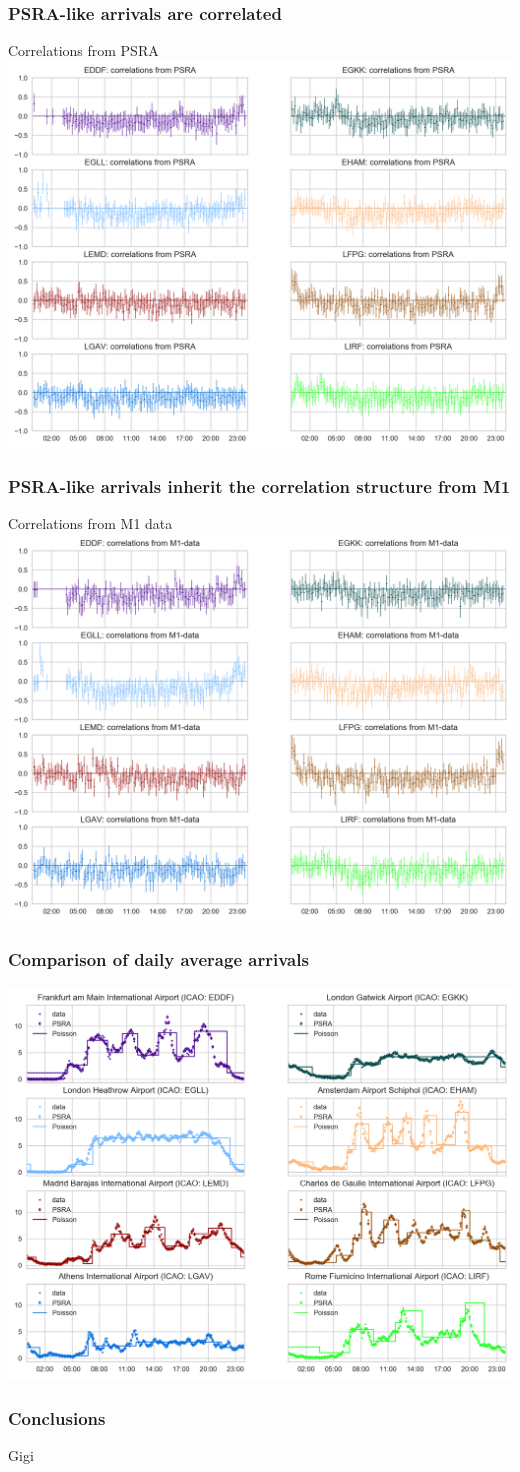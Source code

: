 \documentclass[table,serif,mathserif,professionalfont,aspectratio=169]{beamer}
\begin{document}
  \begin{frame}[t]\frametitle{PSRA-like arrivals are correlated}
      \begin{alertblock}{Correlations from PSRA}
        \centering
        \includegraphics[width=.6\textwidth]{correlations_psra}
      \end{alertblock}
  \end{frame}

  \begin{frame}[t]\frametitle{PSRA-like arrivals inherit the correlation structure from M1}
      \begin{alertblock}{Correlations from M1 data}
        \centering
        \includegraphics[width=.6\textwidth]{correlations_m1}
      \end{alertblock}
  \end{frame}

  \begin{frame}[t]\frametitle{Comparison of daily average arrivals}
      \centering
      \includegraphics[width=.75\textwidth]{mean_simul_arrivals}
  \end{frame}

  \begin{frame}[t]\frametitle{Conclusions}
    Gigi
  \end{frame}
\end{document}

